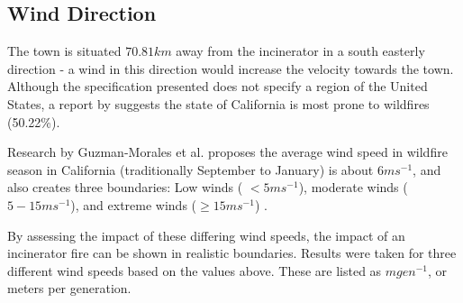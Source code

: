 \documentclass[11pt, a4paper, titlepage]{article}
\begin{document}







  \subsection{Wind Direction}
  The town is situated $70.81km$ away from the incinerator in a south easterly direction - a wind in this direction would increase the velocity towards the town. Although the specification presented does not specify a region of the United States, a report by \cite{Thompson2011} suggests the state of California is most prone to wildfires (50.22\%). 
  
  Research by Guzman-Morales et al. proposes the average wind speed in wildfire season in California (traditionally September to January) is about $6ms^{-1}$, and also creates three boundaries: Low winds ( $< 5ms^{-1}$), moderate winds ($ 5 - 15 ms^{-1}$), and extreme winds ($ \geq 15ms^{-1}$) \cite{doi:10.1002/2016GL067887}. 
  
  By assessing the impact of these differing wind speeds, the impact of an incinerator fire can be shown in realistic boundaries. Results were taken for three different wind speeds based on the values above. These are listed as $mgen^{-1}$, or meters per generation.
\end{document}
